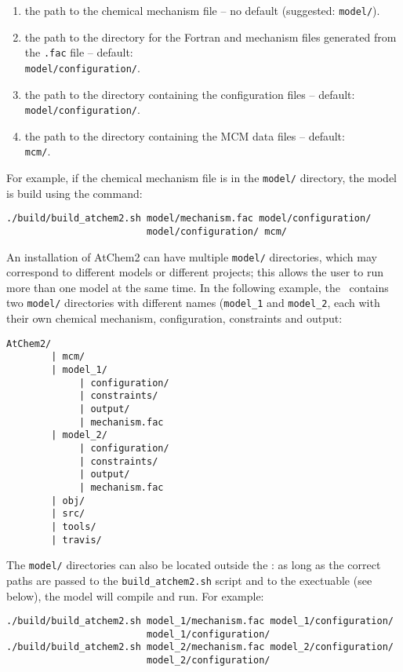 \begin{enumerate}
\item the path to the chemical mechanism file -- no default
  (suggested: \texttt{model/}).
\item the path to the directory for the Fortran and mechanism files
  generated from the \texttt{.fac} file -- default:\\
  \texttt{model/configuration/}.
\item the path to the directory containing the configuration files --
  default:\\
  \texttt{model/configuration/}.
\item the path to the directory containing the MCM data files -- default:\\
  \texttt{mcm/}.
\end{enumerate}

For example, if the chemical mechanism file is in the \texttt{model/}
directory, the model is build using the command:

\begin{verbatim}
./build/build_atchem2.sh model/mechanism.fac model/configuration/
                         model/configuration/ mcm/
\end{verbatim}

An installation of AtChem2 can have multiple \texttt{model/}
directories, which may correspond to different models or different
projects; this allows the user to run more than one model at the same
time. In the following example, the \maindir\ contains two
\texttt{model/} directories with different names (\texttt{model\_1}
and \texttt{model\_2}, each with their own chemical mechanism,
configuration, constraints and output:

\begin{verbatim}
AtChem2/
        | mcm/
        | model_1/
             | configuration/
             | constraints/
             | output/
             | mechanism.fac
        | model_2/
             | configuration/
             | constraints/
             | output/
             | mechanism.fac
        | obj/
        | src/
        | tools/
        | travis/
\end{verbatim}

The \texttt{model/} directories can also be located outside the
\maindir: as long as the correct paths are passed to the
\texttt{build\_atchem2.sh} script and to the exectuable (see below),
the model will compile and run. For example:

\begin{verbatim}
./build/build_atchem2.sh model_1/mechanism.fac model_1/configuration/
                         model_1/configuration/
./build/build_atchem2.sh model_2/mechanism.fac model_2/configuration/
                         model_2/configuration/
\end{verbatim}


